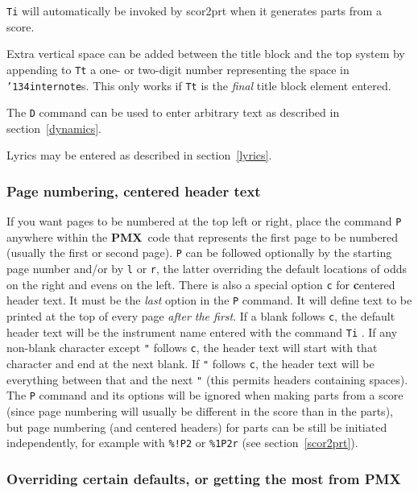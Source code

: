\documentclass[11pt]{article}
\def\bs{{\tt\char'134}}
\newcommand\PMXX{\textbf{PMX}}
\newcommand\PMX{\PMXX~}
\def\newfrom{2.59}  %
\def\NEW#1{\ifdim#1 pt<\newfrom pt\else%
\marginpar{\fbox{#1}}\fi}
\begin{document}
{\tt Ti} will automatically be invoked by {\bfx scor2prt} when it generates 
parts from a score.  

Extra vertical space can be added between the title 
block and the top system by appending to {\tt Tt} a one- or two-digit 
number representing the space in \bs{\tt internote}s.  This only works if 
{\tt Tt} is the {\it final} title block element entered.

The {\tt D} command can be used to enter arbitrary text as described in
section~\ref{dynamics}. 

Lyrics may be entered as described in section~\ref{lyrics}.\NEW{2.73}

\subsubsection{Page numbering, centered header text}

	If you want pages to be numbered at the top left or right, place 
the command {\tt P} anywhere within the \PMX code that represents the first 
page to be numbered (usually the first or second page).  
{\tt P} can be followed optionally by the starting 
page number and/or by {\tt l} or {\tt r}, the latter overriding the default 
locations of odds on the right and evens on the left. \NEW{2.0}  
There is also a special option {\tt c} for {\bf c}entered header text.  
It must be the {\it last} 
option in the {\tt P} command.  It will define text to be printed at the top of
every page {\it after the first}.  If a blank follows {\tt c}, the default 
header text will
be the instrument name entered with the command {\tt Ti} .  If any non-blank
character except {\tt "} follows {\tt c}, the header text will start with that
character and end at the next blank.  If {\tt "} follows {\tt c}, the 
header text will be everything between that and the next {\tt "} (this
permits headers containing spaces).  The {\tt P} command and its options 
will be ignored when making parts from a score (since page numbering 
will usually be different in the score than in the parts), but page 
numbering (and centered headers) for parts can be still be initiated 
independently, for example with {\tt \%!P2} or {\tt \%1P2r} (see 
section~\ref{scor2prt}).

\subsubsection{Overriding certain defaults, or 
getting the most from \PMXX}\label{Acommands} 
\end{document}
